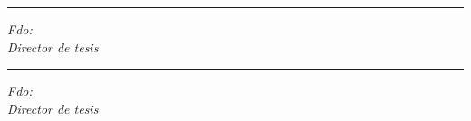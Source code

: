 \vspace{20ex}
\begin{minipage}[t]{.48\textwidth}
\centering
\rule{\textwidth}{.7pt}
\textit{Fdo:} \textbf{\thesisFirstSupervisor}\\
\textit{Director de tesis}
\end{minipage}
\begin{minipage}[t]{.48\textwidth}
\centering
\rule{\textwidth}{.7pt}
\textit{Fdo:} \textbf{\thesisSecondSupervisor}\\
\textit{Director de tesis}
\end{minipage}
